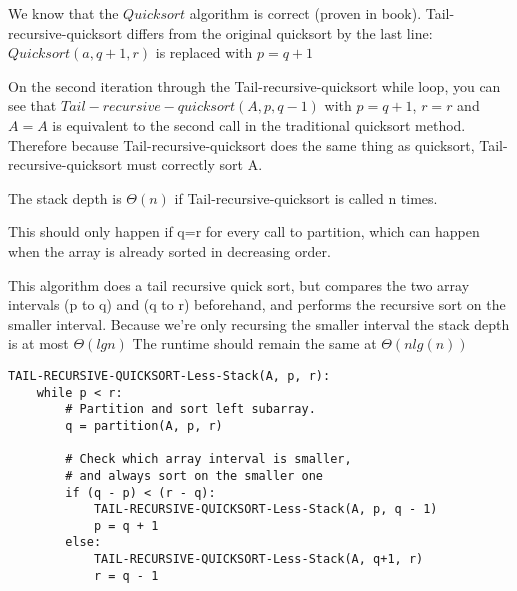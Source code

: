 \documentclass[12pt]{article}
\newenvironment{question}[2][Question]{\begin{trivlist}
		\item[\hskip \labelsep {\bfseries #1}\hskip \labelsep {\bfseries #2.}]}{\end{trivlist}}
\begin{document}
\begin{question}{4a}	
	We know that the $Quicksort$ algorithm is correct (proven in book). Tail-recursive-quicksort differs from the original quicksort by the last line: $Quicksort(a,q+1,r)$ is replaced with $p=q+1$
	
	On the second iteration through the Tail-recursive-quicksort while loop, you can see that $ Tail-recursive-quicksort(A, p, q-1)$ with $p=q+1$, $r=r$ and $A=A$ is equivalent to the second call in the traditional quicksort method. Therefore because Tail-recursive-quicksort does the same thing as quicksort, Tail-recursive-quicksort must correctly sort A.
\end{question}

\begin{question}{4b}	
	The stack depth is $\Theta(n)$ if Tail-recursive-quicksort is called n times. 
	
	This should only happen if q=r for every call to partition, which can happen when the array is already sorted in decreasing order.
\end{question}

\begin{question}{4c}	
	
	This algorithm does a tail recursive quick sort, but compares the two array intervals (p to q) and (q to r) beforehand, and performs the recursive sort on the smaller interval. 
	Because we're only recursing the smaller interval the stack depth is at most $\Theta(lgn)$
	The runtime should remain the same at $\Theta(n lg(n))$
	
\begin{lstlisting}
TAIL-RECURSIVE-QUICKSORT-Less-Stack(A, p, r):
	while p < r:
		# Partition and sort left subarray.
		q = partition(A, p, r)
		
		# Check which array interval is smaller, 
		# and always sort on the smaller one
		if (q - p) < (r - q):
			TAIL-RECURSIVE-QUICKSORT-Less-Stack(A, p, q - 1)
			p = q + 1
		else:
			TAIL-RECURSIVE-QUICKSORT-Less-Stack(A, q+1, r)
			r = q - 1
\end{lstlisting}	
	

\end{question}
\end{document}
